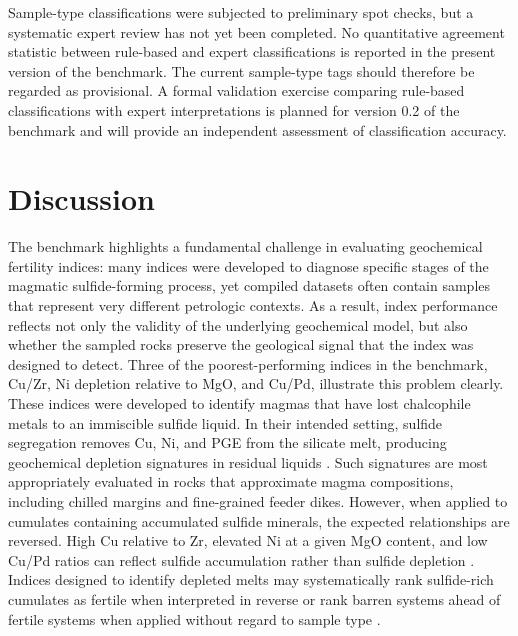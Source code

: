 \documentclass[10pt,twocolumn,letterpaper]{article}
\begin{document}
Sample-type classifications were subjected to preliminary spot checks, but a systematic expert review has not yet been completed. No quantitative agreement statistic between rule-based and expert classifications is reported in the present version of the benchmark. The current sample-type tags should therefore be regarded as provisional. A formal validation exercise comparing rule-based classifications with expert interpretations is planned for version 0.2 of the benchmark and will provide an independent assessment of classification accuracy.

\section{Discussion}

The benchmark highlights a fundamental challenge in evaluating geochemical fertility indices: many indices were developed to diagnose specific stages of the magmatic sulfide-forming process, yet compiled datasets often contain samples that represent very different petrologic contexts. As a result, index performance reflects not only the validity of the underlying geochemical model, but also whether the sampled rocks preserve the geological signal that the index was designed to detect. Three of the poorest-performing indices in the benchmark, Cu/Zr, Ni depletion relative to MgO, and Cu/Pd, illustrate this problem clearly. These indices were developed to identify magmas that have lost chalcophile metals to an immiscible sulfide liquid. In their intended setting, sulfide segregation removes Cu, Ni, and PGE from the silicate melt, producing geochemical depletion signatures in residual liquids \cite{mansur2021,pina2013}. Such signatures are most appropriately evaluated in rocks that approximate magma compositions, including chilled margins and fine-grained feeder dikes. However, when applied to cumulates containing accumulated sulfide minerals, the expected relationships are reversed. High Cu relative to Zr, elevated Ni at a given MgO content, and low Cu/Pd ratios can reflect sulfide accumulation rather than sulfide depletion \cite{gao2012,gao2013,seat2009}. Indices designed to identify depleted melts may systematically rank sulfide-rich cumulates as fertile when interpreted in reverse or rank barren systems ahead of fertile systems when applied without regard to sample type \cite{grondahl2021,grondahlzajacz2022}.
\end{document}
